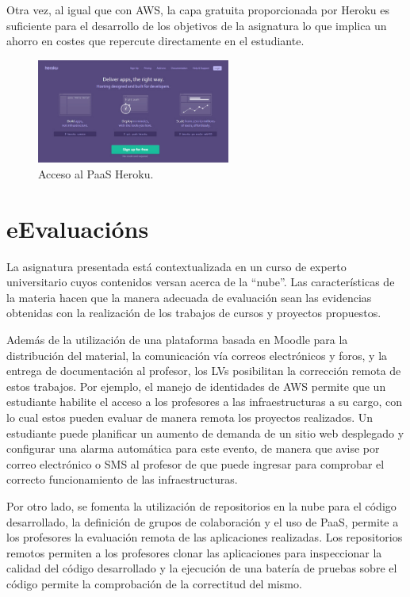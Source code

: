 \documentclass[conference]{IEEEtran}
\begin{document}
Otra vez, al igual que con AWS, la capa gratuita proporcionada por Heroku es suficiente para el desarrollo de los objetivos de la asignatura lo que implica un ahorro en costes que repercute directamente en el estudiante.

\begin{figure}[!t]
\centering
\includegraphics[width=2.5in]{heroku.jpeg}
\caption{Acceso al PaaS Heroku.}
\label{fig:heroku}
\end{figure}




\section{eEvaluacións
\label{sec:eValuacion}}

La asignatura presentada está contextualizada en un curso de experto universitario cuyos contenidos versan acerca de la ``nube''.
Las características de la materia hacen que la manera adecuada de evaluación sean las evidencias obtenidas con la realización de los trabajos de cursos y proyectos propuestos.

Además de la utilización de una plataforma basada en Moodle para la distribución del material, la comunicación vía correos electrónicos y foros, y la entrega de documentación al profesor,
los LVs posibilitan la corrección remota de estos trabajos. Por ejemplo, el manejo de identidades de AWS permite que un estudiante habilite el acceso a los profesores a las infraestructuras a su cargo,
con lo cual estos pueden evaluar de manera remota los proyectos realizados.
Un estudiante puede planificar un aumento de demanda de un sitio web desplegado y configurar una alarma automática para este evento,
de manera que avise por correo electrónico o SMS al profesor de que puede ingresar para 
comprobar el correcto funcionamiento de las infraestructuras.


Por otro lado, se fomenta la utilización de repositorios en la nube para el código desarrollado, la definición de grupos de colaboración y el uso de PaaS, permite a los profesores la evaluación remota de las aplicaciones realizadas.
Los repositorios remotos permiten a los profesores clonar las aplicaciones para inspeccionar la calidad del código desarrollado y
la ejecución de una batería de pruebas sobre el código permite la comprobación de la correctitud del mismo. 
\end{document}

